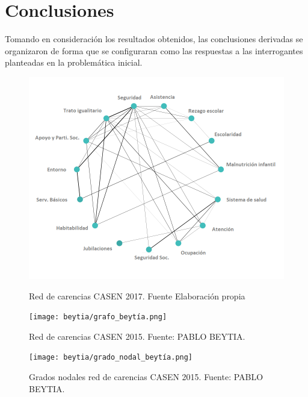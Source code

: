 \documentclass[12pt,letterpaper,spanish]{article}
\begin{document}
\newpage
\section{Conclusiones} %


Tomando en consideración los resultados obtenidos, las conclusiones derivadas se organizaron de forma que se configuraran como las respuestas a las interrogantes planteadas en la problemática inicial. 


\begin{figure}[H]
  \centering
  \begin{minipage}[b]{0.49\textwidth}
    \includegraphics[width=\textwidth]{Grafos/GrafoCarencias.png}
    \caption{Red de carencias CASEN 2017. Fuente Elaboración propia}
    \label{red2017}
  \end{minipage}
  \hfill
  \begin{minipage}[b]{0.49\textwidth}
    \texttt{[image: beytia/grafo\_beytía.png]}
    \caption{Red de carencias CASEN 2015. Fuente: PABLO BEYTIA.}
    \label{red2015}
  \end{minipage}
\end{figure}




\begin{figure}[H]
    \centering
    \texttt{[image: beytia/grado\_nodal\_beytía.png]}
    \caption{Grados nodales red de carencias CASEN 2015. Fuente: PABLO BEYTIA.}
    \label{nodos2015}
\end{figure}
\end{document}
